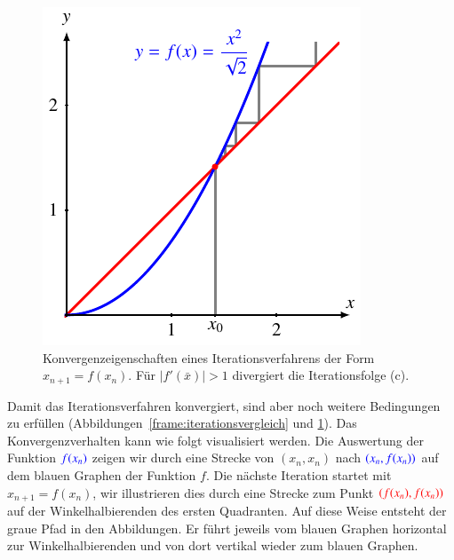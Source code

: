 \begin{figure}
\centering
\includegraphics{chapters/1a-frames/images/div.pdf}
\caption{Konvergenzeigenschaften eines Iterationsverfahrens der Form
$x_{n+1}=f(x_n)$.
Für $|f'(\bar{x})|>1$ divergiert die Iterationsfolge (c).
\label{frame:divergenz}}
\end{figure}

Damit das Iterationsverfahren konvergiert, sind aber noch weitere
Bedingungen zu erfüllen (Abbildungen~\ref{frame:iterationsvergleich}
und \ref{frame:divergenz}).
Das Konvergenzverhalten kann wie folgt visualisiert werden.
Die Auswertung der Funktion $\color{blue}f(x_n)$ zeigen wir durch
eine Strecke von $(x_n,x_n)$ nach $\color{blue}(x_n,f(x_n))$ auf
dem blauen Graphen der Funktion $f$.
Die nächste Iteration startet mit $x_{n+1} = f(x_n)$, wir illustrieren
dies durch eine Strecke zum Punkt $\color{red}(f(x_n),f(x_n))$ auf der
Winkelhalbierenden des ersten Quadranten.
Auf diese Weise entsteht der graue Pfad in den Abbildungen.
\label{frame:grauerpfad}
Er führt jeweils vom blauen Graphen horizontal zur Winkelhalbierenden
und von dort vertikal wieder zum blauen Graphen.

